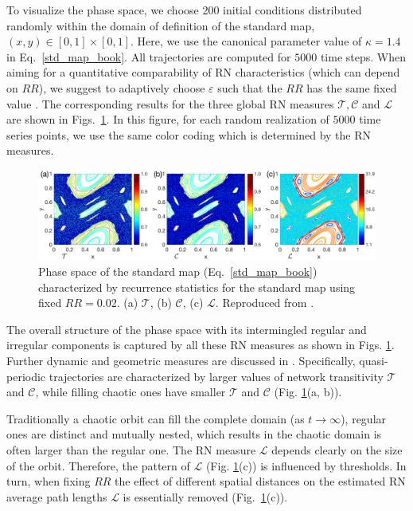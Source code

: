 		To visualize the phase space, we choose 200 initial conditions distributed randomly within the domain of definition of the standard map, $(x,y) \in [0, 1] \times [0, 1]$. Here, we use the canonical parameter value of $\kappa = 1.4$ in Eq.~\eqref{std_map_book}. All trajectories are computed for $5000$ time steps. When aiming for a quantitative comparability of RN characteristics (which can depend on $RR$), we suggest to adaptively choose $\varepsilon$ such that the $RR$ has the same fixed value \cite{Zou2016d}. The corresponding results for the three global RN measures $\mathcal{T}, \mathcal{C}$ and $\mathcal{L}$ are shown in Figs.~\ref{fig:sm_rec_rr}. In this figure, for each random realization of $5000$ time series points, we use the same color coding which is determined by the RN measures. 
\begin{figure}
	\centering
	\includegraphics[width=\columnwidth]{Chapter07_Applications/stdFixedRRP.eps}
\caption{\small {Phase space of the standard map (Eq.~\eqref{std_map_book}) characterized by recurrence statistics for the standard map using fixed $RR=0.02$. (a) $\mathcal{T}$, (b) $\mathcal{C}$, (c) $\mathcal{L}$. Reproduced from \cite{Zou2016d}. } \label{fig:sm_rec_rr}}
\end{figure}
		
		The overall structure of the phase space with its intermingled regular and irregular components is captured by all these RN measures as shown in Figs. \ref{fig:sm_rec_rr}.  Further dynamic  and geometric measures are discussed in \cite{Zou2016d}. Specifically, quasi-periodic trajectories are characterized by larger values of network transitivity $\mathcal{T}$ and $\mathcal{C}$, while filling chaotic ones have smaller $\mathcal{T}$ and $\mathcal{C}$ (Fig. \ref{fig:sm_rec_rr}(a, b)). 
		
		Traditionally a chaotic orbit can fill the complete domain (as $t\to\infty$), regular ones are distinct and mutually nested, which results in the chaotic domain is often larger than the regular one. The RN measure $\mathcal{L}$ depends clearly on the size of the orbit. Therefore, the pattern of $\mathcal{L}$ (Fig. \ref{fig:sm_rec_rr}(c)) is influenced by thresholds. In turn, when fixing $RR$ the effect of different spatial distances on the estimated RN average path lengths $\mathcal{L}$ is essentially removed (Fig.~\ref{fig:sm_rec_rr}(c)). 
		
